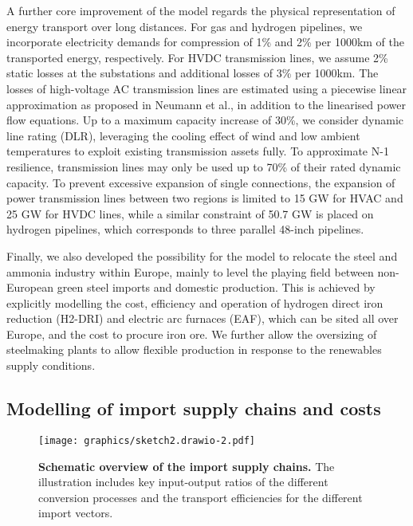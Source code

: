 \documentclass[5p,10pt]{elsarticle}
\begin{document}
A further core improvement of the model regards the physical representation of
energy transport over long distances. For gas and hydrogen pipelines, we
incorporate electricity demands for compression of 1\% and 2\% per 1000km
of the transported energy, respectively.\cite{gasforclimateEuropeanHydrogen2021}
For HVDC transmission lines, we assume 2\% static losses at the substations and
additional losses of 3\% per 1000km. The losses of high-voltage AC transmission
lines are estimated using a piecewise linear approximation as proposed in
Neumann et al.,\cite{neumannAssessmentsLinear2022} in addition to the linearised
power flow equations.\cite{horschLinearOptimal2018} Up to a maximum capacity
increase of 30\%, we consider dynamic line rating (DLR), leveraging the cooling
effect of wind and low ambient temperatures to exploit existing transmission
assets fully.\cite{glaumLeveragingExisting2023} To approximate N-1 resilience,
transmission lines may only be used up to 70\% of their rated dynamic capacity.
To prevent excessive expansion of single connections, the expansion of power
transmission lines between two regions is limited to 15 GW for HVAC and 25 GW
for HVDC lines, while a similar constraint of 50.7 GW is placed on hydrogen
pipelines, which corresponds to three parallel 48-inch
pipelines.\cite{gasforclimateEuropeanHydrogen2021}

Finally, we also developed the possibility for the model to relocate the steel
and ammonia industry within Europe, mainly to level the playing field between
non-European green steel imports and domestic production. This is achieved by
explicitly modelling the cost, efficiency and operation of hydrogen direct iron
reduction (H2-DRI) and electric arc furnaces (EAF), which can be sited all over
Europe, and the cost to procure iron ore. We further allow the oversizing of
steelmaking plants to allow flexible production in response to the renewables
supply conditions.

\subsection*{Modelling of import supply chains and costs}

\begin{figure*}
    \centering
    \texttt{[image: graphics/sketch2.drawio-2.pdf]}
    \caption{\textbf{Schematic overview of the import supply chains.} The
    illustration includes key input-output ratios of the different conversion
    processes and the transport efficiencies for the different import vectors.}
    \label{fig:import-esc-scheme}
\end{figure*}
\end{document}
